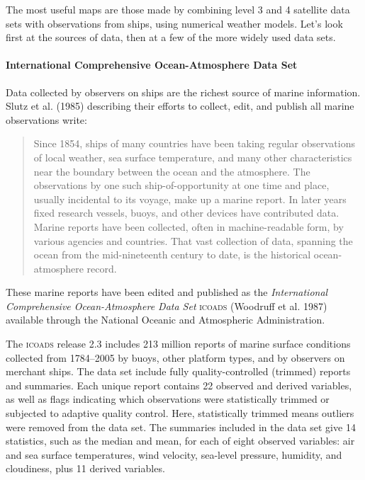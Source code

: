 The most useful maps are those made by combining level 3 and 4
satellite data sets with observations from ships, using numerical
weather models. Let's look first at the sources of data, then at a few
of the more widely used data sets.

\paragraph{International Comprehensive Ocean-Atmosphere Data Set}
Data collected by observers on ships are the richest
source of marine information. Slutz et al.  (1985) describing their
efforts to collect, edit, and publish all marine observations write:
\begin{quotation} \small
Since 1854, ships of many countries have been taking regular observations
of local weather, sea surface temperature, and many other characteristics
near the boundary between the ocean and the atmosphere. The observations
by one such ship-of-opportunity at one time and place, usually incidental
to its voyage, make up a marine report. In later years fixed research
vessels, buoys, and other devices have contributed data. Marine reports
have been collected, often in machine-readable form, by various agencies and
countries. That vast collection of data, spanning the ocean from
the mid-nineteenth century to date, is the historical ocean-atmosphere record.
\end{quotation}
These marine reports have been edited and published as the
\textit{International Comprehensive Ocean-Atmos\-phere Data Set}
\textsc{icoads} (Woodruff et al.  1987) available through
the National Oceanic and Atmospheric Administration.

The \textsc{icoads} release 2.3 includes 213 million reports of marine
surface conditions collected from 1784--2005 by buoys, other platform
types, and by observers on merchant ships. The data set include fully
quality-controlled (trimmed) reports and summaries. Each unique report
contains 22 observed and derived variables, as well as flags
indicating which observations were statistically trimmed or subjected
to adaptive quality control. Here, statistically trimmed means
outliers were removed from the data set. The summaries included in the
data set give 14 statistics, such as the median and mean, for each of
eight observed variables: air and sea surface temperatures, wind
velocity, sea-level pressure, humidity, and cloudiness, plus 11
derived variables.

